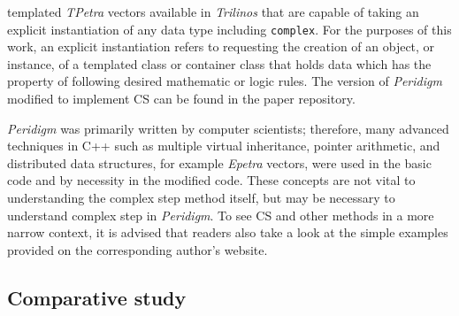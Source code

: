 \documentclass[preprint,12pt]{elsarticle}
\begin{document}
templated \emph{TPetra} vectors available in \emph{Trilinos} that are capable of taking an explicit instantiation of any data type including {\tt complex}. For the purposes of this work, an explicit instantiation refers to requesting the creation of an object, or instance, of a templated class or container class that holds data which has the property of following desired mathematic or logic rules. The version of \emph{Peridigm} modified to implement CS can be found in the paper repository.  

\emph{Peridigm} was primarily written by computer scientists; therefore,
many advanced techniques in C++ such as multiple virtual inheritance, pointer
arithmetic, and distributed data structures, for example \emph{Epetra} vectors, were used in the basic
    code and by necessity in the modified code. These concepts are not vital to
understanding the complex step method itself, but may be necessary to understand complex
step in \emph{Peridigm}. To see CS and other methods in a more narrow context,
it is advised that readers also take a look at the simple examples provided on
the corresponding author's website.

\subsection{Comparative study} 
\label{tcs}
\end{document}

